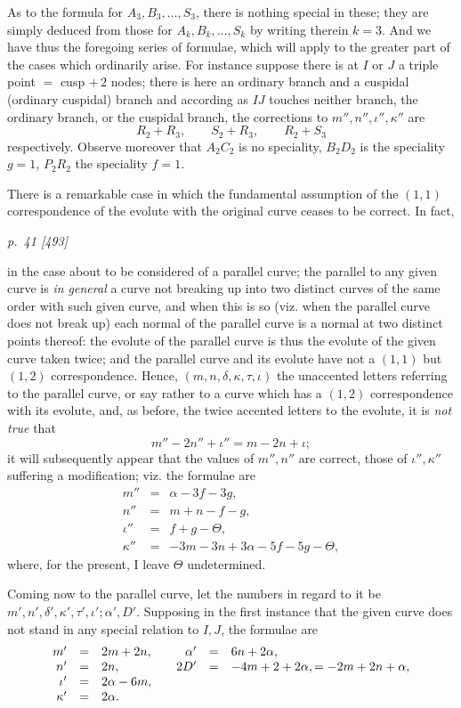 ﻿\documentclass[11pt,a4paper]{article}
\theoremstyle{plain}
\theoremstyle{definition}
\begin{document}
As to the formula for \(A_3,B_3,\ldots,S_3\), there is nothing special in
these; they are simply deduced from those for \(A_k,B_k,\ldots,S_k\) by
writing therein \(k=3\). And we have thus the foregoing series of
formulae, which will apply to the greater part of the cases which
ordinarily arise. For instance suppose there is at \(I\) or \(J\) a triple
point \(=\) cusp \(+\,2\) nodes; there is here an ordinary branch and a
cuspidal (ordinary cuspidal) branch and according as \(IJ\) touches
neither branch, the ordinary branch, or the cuspidal branch, the
corrections to \(m'',n'',\iota'',\kappa''\) are
\[
R_2+R_3,\qquad S_2+R_3,\qquad R_2+S_3
\]
respectively. Observe moreover that \(A_2C_2\) is no speciality,
\(B_2D_2\) is the speciality \(g=1\), \(P_2R_2\) the speciality \(f=1\).

There is a remarkable case in which the fundamental assumption of the
\((1,1)\) correspondence of the evolute with the original curve ceases to
be correct. In fact,

\clearpage
\textit{p.~41 [493]}

in the case about to be considered of a parallel curve; the parallel to
any given curve is \textit{in general} a curve not breaking up into two
distinct curves of the same order with such given curve, and when this is
so (viz. when the parallel curve does not break up) each normal of the
parallel curve is a normal at two distinct points thereof: the evolute of
the parallel curve is thus the evolute of the given curve taken twice; and
the parallel curve and its evolute have not a \((1,1)\) but \((1,2)\)
correspondence. Hence, \((m,n,\delta,\kappa,\tau,\iota)\) the unaccented
letters referring to the parallel curve, or say rather to a curve which
has a \((1,2)\) correspondence with its evolute, and, as before, the twice
accented letters to the evolute, it is \textit{not true} that
\[
m''-2n''+\iota''=m-2n+\iota;
\]
it will subsequently appear that the values of \(m'',n''\) are correct,
those of \(\iota'',\kappa''\) suffering a modification; viz. the formulae
are
\[
\begin{array}{rcl}
m''&=&\alpha-3f-3g,\\
n''&=&m+n-f-g,\\
\iota''&=&f+g-\Theta,\\
\kappa''&=&-3m-3n+3\alpha-5f-5g-\Theta,
\end{array}
\]
where, for the present, I leave \(\Theta\) undetermined.

Coming now to the parallel curve, let the numbers in regard to it be
\(m',n',\delta',\kappa',\tau',\iota';\alpha',D'\). Supposing in the first
instance that the given curve does not stand in any special relation to
\(I,J\), the formulae are
\[
\begin{array}{rcl@{\qquad}rcl}
m'&=&2m+2n, & \alpha'&=&6n+2\alpha,\\
n'&=&2n, & 2D'&=&-4m+2+2\alpha,=-2m+2n+\alpha,\\
\iota'&=&2\alpha-6m,\\
\kappa'&=&2\alpha.
\end{array}
\]
\end{document}
